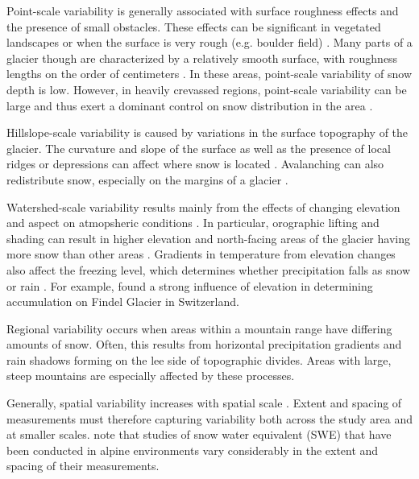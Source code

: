 \documentclass[12pt]{article}
\begin{document}
Point-scale variability is generally associated with surface roughness effects and the presence of small obstacles. These effects can be significant in vegetated landscapes or when the surface is very rough (e.g. boulder field) \citep{Lopez2011}. Many parts of a glacier though are characterized by a relatively smooth surface, with roughness lengths on the order of centimeters \citep{Hock2005}. In these areas, point-scale variability of snow depth is low. However, in heavily crevassed regions, point-scale variability can be large and thus exert a dominant control on snow distribution in the area \citep{McGrath2015}. 

Hillslope-scale variability is caused by variations in the surface topography of the glacier. The curvature and slope of the surface as well as the presence of local ridges or depressions can affect where snow is located \citep{Bloeschl1999, Sold2013}. Avalanching can also redistribute snow, especially on the margins of a glacier \citep{Bloschl1991, Mott2008}. 

Watershed-scale variability results mainly from the effects of changing elevation and aspect on atmopsheric conditions \citep{Clark2011}. In particular, orographic lifting and shading can result in higher elevation and north-facing areas of the glacier having more snow than other areas \citep{Mott2008, Sold2013}. Gradients in temperature from elevation changes also affect the freezing level, which determines whether precipitation falls as snow or rain \citep{Bloschl1991}. For example, \cite{Machguth2006} found a strong influence of elevation in determining accumulation on Findel Glacier in Switzerland.

Regional variability occurs when areas within a mountain range have differing amounts of snow. Often, this results from horizontal precipitation gradients and rain shadows forming on the lee side of topographic divides. Areas with large, steep mountains are especially affected by these processes.

Generally, spatial variability increases with spatial scale \citep{Clark2011}. Extent and spacing of measurements must therefore capturing variability both across the study area and at smaller scales. \cite{Clark2011} note that studies of snow water equivalent (SWE) that have been conducted in alpine environments vary considerably in the extent and spacing of their measurements. 
\end{document}
